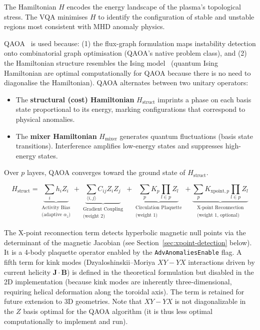 \documentclass[12pt, a4paper, oneside]{report}
\begin{document}
The Hamiltonian $H$ encodes the energy landscape of the plasma's topological stress. The VQA minimises $H$ to identify the configuration of stable and unstable regions most consistent with MHD anomaly physics.

QAOA~\cite{farhi2014} is used because: (1) the flux-graph formulation maps instability detection onto combinatorial graph optimisation (QAOA's native problem class), and (2) the Hamiltonian structure resembles the Ising model~\cite{lucas2014} (quantum Ising Hamiltonian are optimal computationally for QAOA because there is no need to diagonalise the Hamiltonian). QAOA alternates between two unitary operators:
\begin{itemize}
    \item The \textbf{structural (cost) Hamiltonian} $H_{\text{struct}}$ imprints a phase on each basis state proportional to its energy, marking configurations that correspond to physical anomalies.
    \item The \textbf{mixer Hamiltonian} $H_{\text{mixer}}$ generates quantum fluctuations (basis state transitions). Interference amplifies low-energy states and suppresses high-energy states.
\end{itemize}
Over $p$ layers, QAOA converges toward the ground state of $H_{\text{struct}}$.


\begin{equation}
    H_{\text{struct}} =
    \underbrace{\sum_i h_i Z_i}_{\substack{\text{Activity Bias} \\ \text{(adaptive } \alpha_z \text{)}}} +
    \underbrace{\sum_{\langle i,j \rangle} C_{ij} Z_i Z_j}_{\substack{\text{Gradient Coupling} \\ \text{(weight 2)}}} +
    \underbrace{\sum_{p} K_p \prod_{l \in p} Z_l}_{\substack{\text{Circulation Plaquette} \\ \text{(weight 1)}}} +
    \underbrace{\sum_{p} K_{\text{xpoint},p} \prod_{l \in p} Z_l}_{\substack{\text{X-point Reconnection} \\ \text{(weight 1, optional)}}}
\end{equation}

\noindent The X-point reconnection term detects hyperbolic magnetic null points via the determinant of the magnetic Jacobian (see Section~\ref{sec:xpoint-detection} below). It is a 4-body plaquette operator enabled by the \texttt{AdvAnomaliesEnable} flag. A fifth term for kink modes (Dzyaloshinskii--Moriya $XY - YX$ interactions driven by current helicity $\mathbf{J} \cdot \mathbf{B}$) is defined in the theoretical formulation but disabled in the 2D implementation (because kink modes are inherently three-dimensional, requiring helical deformation along the toroidal axis). The term is retained for future extension to 3D geometries. Note that $XY - YX$ is not diagonalizable in the $Z$ basis optimal for the QAOA algorithm (it is thus less optimal computationally to implement and run).
\end{document}
